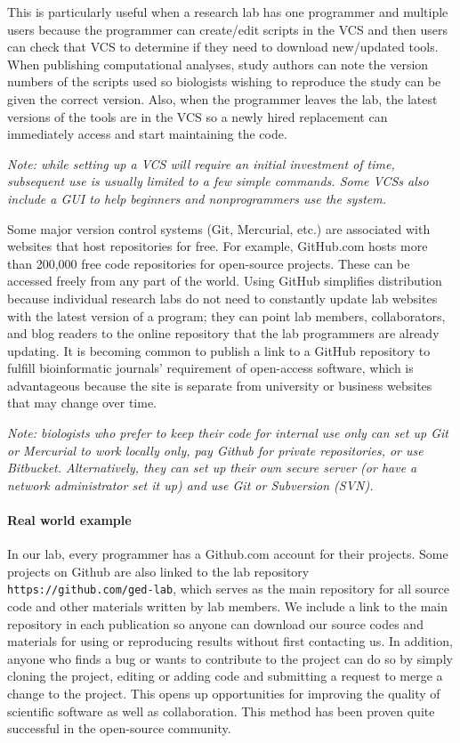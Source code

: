 \documentclass[ChapterTOCs,krantz2]{krantz} %
\begin{document}
This is particularly useful when a research lab has one programmer 
and multiple users because the programmer can create/edit scripts in
the VCS and then users can check that VCS to determine if they need to
download new/updated tools.  When publishing 
computational analyses, study
authors can note the version numbers of the scripts used so biologists
wishing to reproduce the study can be given the correct version.
Also, when the programmer leaves the lab, the latest versions of the
tools are in the VCS so a newly hired replacement can immediately
access and start maintaining the code.

\textsl{Note: while setting up a VCS will require an initial investment of time, 
subsequent use is usually limited to a few simple commands.  Some VCSs
also include a GUI to help beginners and nonprogrammers use the system.}

Some major version control systems (Git, Mercurial, etc.) are associated with websites 
that host repositories for free.  For example, GitHub.com hosts more than 200,000 free code
repositories for open-source projects. These can be accessed
freely from any part of the world.  Using GitHub
simplifies distribution because individual research labs do not need to
constantly update lab websites with the latest version of a program;
they can point lab members, collaborators, and blog readers to the online
repository that the lab programmers are already updating.  It is becoming 
common to publish a link to a GitHub repository to
fulfill bioinformatic journals' requirement of open-access software, 
which is advantageous because the site is separate from
university or business websites that may change over time.  

\textsl{Note: biologists who prefer to keep their
code for internal use only can set up Git or Mercurial to work 
locally only, pay Github for private repositories, or use Bitbucket.  
Alternatively, they can set up their own secure
server (or have a network administrator set it up) and use
Git or Subversion (SVN).}

\paragraph{Real world example}

In our lab, every programmer has a Github.com account for their projects.
Some
projects on Github are also linked to the lab repository
\texttt{https://github.com/ged-lab}, which serves as the main repository for
all source code and other materials written by lab members. 
We include a link to the main repository in each
publication so anyone can download our source codes and materials
for using or reproducing results without first contacting us. 
In addition, anyone who finds a bug or wants to contribute to
the project can do so by simply cloning the project, editing or adding code
and submitting a request to merge a change to the project.
This opens up opportunities for improving the quality of scientific software
as well as collaboration.
This method has been proven quite successful in the open-source community.
\end{document}
